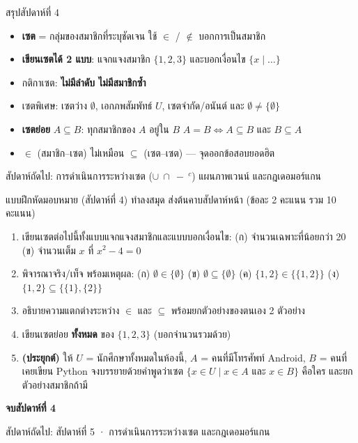 \begin{frame}{สรุปสัปดาห์ที่ 4}
  \begin{itemize}
    \item \textbf{เซต} = กลุ่มของสมาชิกที่ระบุชัดเจน ใช้ $\in$ / $\notin$ บอกการเป็นสมาชิก
    \item \textbf{เขียนเซตได้ 2 แบบ}: แจกแจงสมาชิก $\{1,2,3\}$ และบอกเงื่อนไข $\{x \mid \ldots\}$
    \item กติกาเซต: \textbf{ไม่มีลำดับ ไม่มีสมาชิกซ้ำ}
    \item เซตพิเศษ: เซตว่าง $\emptyset$, เอกภพสัมพัทธ์ $U$, เซตจำกัด/อนันต์ และ $\emptyset \neq \{\emptyset\}$
    \item \textbf{เซตย่อย} $A \subseteq B$: ทุกสมาชิกของ $A$ อยู่ใน $B$ \quad
          $A = B \Leftrightarrow A \subseteq B$ และ $B \subseteq A$
    \item $\in$ (สมาชิก--เซต) ไม่เหมือน $\subseteq$ (เซต--เซต) --- จุดออกข้อสอบยอดฮิต
  \end{itemize}
  \begin{exampleblock}{}
    \centering สัปดาห์ถัดไป: การดำเนินการระหว่างเซต ($\cup\ \cap\ -\ ^c$) แผนภาพเวนน์ และกฎเดอมอร์แกน
  \end{exampleblock}
\end{frame}

\begin{frame}{แบบฝึกหัดมอบหมาย (สัปดาห์ที่ 4)}
  ทำลงสมุด ส่งต้นคาบสัปดาห์หน้า (ข้อละ 2 คะแนน รวม 10 คะแนน)
  \begin{enumerate}\small
    \item เขียนเซตต่อไปนี้ทั้งแบบแจกแจงสมาชิกและแบบบอกเงื่อนไข:
          (ก) จำนวนเฉพาะที่น้อยกว่า 20 \quad (ข) จำนวนเต็ม $x$ ที่ $x^2 - 4 = 0$
    \item พิจารณาจริง/เท็จ พร้อมเหตุผล:
          (ก) $\emptyset \in \{\emptyset\}$ \quad (ข) $\emptyset \subseteq \{\emptyset\}$ \quad
          (ค) $\{1, 2\} \in \{\{1, 2\}\}$ \quad (ง) $\{1, 2\} \subseteq \{\{1\}, \{2\}\}$
    \item อธิบายความแตกต่างระหว่าง $\in$ และ $\subseteq$ พร้อมยกตัวอย่างของตนเอง 2 ตัวอย่าง
    \item เขียนเซตย่อย \textbf{ทั้งหมด} ของ $\{1, 2, 3\}$ (บอกจำนวนรวมด้วย)
    \item \textbf{(ประยุกต์)} ให้ $U$ = นักศึกษาทั้งหมดในห้องนี้, $A$ = คนที่มีโทรศัพท์ Android,
          $B$ = คนที่เคยเขียน Python จงบรรยายด้วยคำพูดว่าเซต
          $\{x \in U \mid x \in A \text{ และ } x \in B\}$ คือใคร และยกตัวอย่างสมาชิกถ้ามี
  \end{enumerate}
\end{frame}

\begin{frame}[plain]
  \vfill
  \centering
  {\Large\color{navy}\textbf{จบสัปดาห์ที่ 4}}\par
  \vspace{0.8em}
  {\color{gray} สัปดาห์ถัดไป: สัปดาห์ที่ 5 · การดำเนินการระหว่างเซต และกฎเดอมอร์แกน}
  \vfill
\end{frame}
